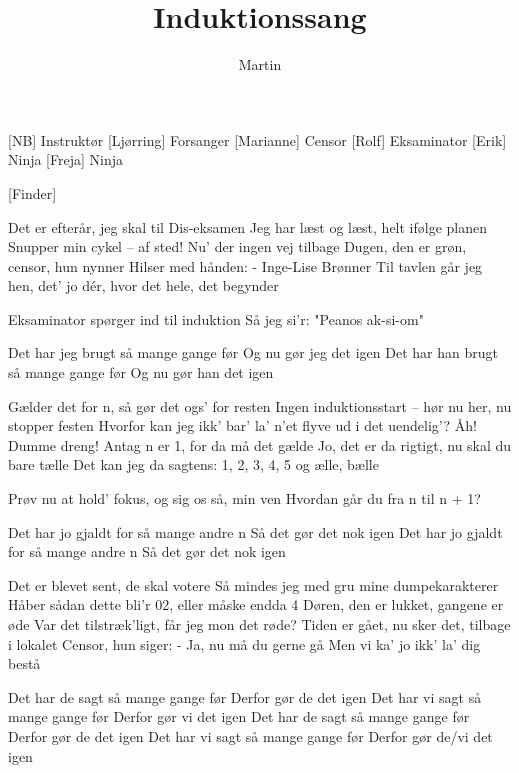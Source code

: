 \documentclass[a4paper,11pt]{article}
\title{Induktionssang}
\author{Martin}
\begin{document}
\maketitle

\begin{roles}
[NB] Instruktør
[Ljørring] Forsanger
[Marianne] Censor
[Rolf] Eksaminator
[Erik] Ninja
[Freja] Ninja
\end{roles}

\begin{props}
[Finder]
\end{props}

\begin{song}
Det er efterår, jeg skal til Dis-eksamen
Jeg har læst og læst, helt ifølge planen
Snupper min cykel – af sted! Nu’ der ingen vej tilbage
Dugen, den er grøn, censor, hun nynner
Hilser med hånden:
- Inge-Lise Brønner
Til tavlen går jeg hen, det’ jo dér, hvor det hele, det begynder

Eksaminator spørger ind til induktion
Så jeg si’r: "Peanos ak-si-om"

Det har jeg brugt så mange gange før
Og nu gør jeg det igen
Det har han brugt så mange gange før
Og nu gør han det igen

Gælder det for n, så gør det ogs’ for resten
Ingen induktionsstart – hør nu her, nu stopper festen
Hvorfor kan jeg ikk’ bar’ la’ n’et flyve ud i det uendelig’?
Åh! Dumme dreng!
Antag n er 1, for da må det gælde
Jo, det er da rigtigt, nu skal du bare tælle
Det kan jeg da sagtens: 1, 2, 3, 4, 5 og ælle, bælle

Prøv nu at hold’ fokus, og sig os så, min ven
Hvordan går du fra n til n + 1?

Det har jo gjaldt for så mange andre n
Så det gør det nok igen
Det har jo gjaldt for så mange andre n
Så det gør det nok igen



Det er blevet sent, de skal votere
Så mindes jeg med gru mine dumpekarakterer
Håber sådan dette bli’r 02, eller måske endda 4
Døren, den er lukket, gangene er øde
Var det tilstræk’ligt, får jeg mon det røde?
Tiden er gået, nu sker det, tilbage i lokalet
Censor, hun siger:
- Ja, nu må du gerne gå
Men vi ka’ jo ikk’ la’ dig bestå

Det har de sagt så mange gange før
Derfor gør de det igen
Det har vi sagt så mange gange før
Derfor gør vi det igen
Det har de sagt så mange gange før
Derfor gør de det igen
Det har vi sagt så mange gange før
Derfor gør de/vi det igen
\end{song}
\end{document}
